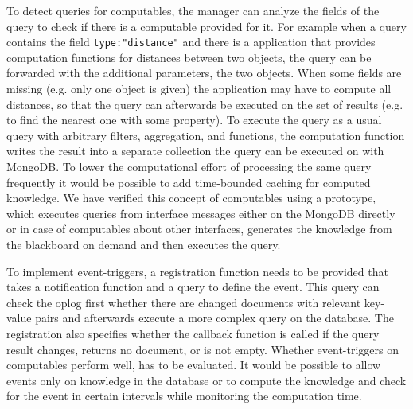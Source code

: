 To detect queries for computables,
the manager can analyze the fields of the query to check if there is a
computable provided for it.  For example when a query contains the
field \texttt{type:"distance"} and there is a application that
provides computation functions for distances between two objects, the
query can be forwarded with the additional parameters, the two
objects.  When some fields are missing (e.g. only one object is given)
the application may have to compute all distances, so that the query
can afterwards be executed on the set of results (e.g. to find the
nearest one with some property). To execute the query as a usual query
with arbitrary filters, aggregation, and functions, the computation
function writes the result into a separate collection the query
can be executed on with MongoDB. To lower the computational effort of
processing the same query frequently it would be possible to add
time-bounded caching for computed knowledge. We have verified this
concept of computables using a prototype, which executes queries from
interface messages either on the MongoDB directly or in case of
computables about other interfaces, generates the knowledge from the
blackboard on demand and then executes the query.

To implement event-triggers, a registration function needs to be
provided that takes a notification function and a query to define the
event. This query can check the oplog first whether there are changed
documents with relevant key-value pairs and afterwards execute a more
complex query on the database. The registration also specifies whether
the callback function is called if the query result changes, returns
no document, or is not empty. Whether event-triggers on computables
perform well, has to be evaluated. It would be possible to allow
events only on knowledge in the database or to compute the knowledge
and check for the event in certain intervals while monitoring the
computation time.



